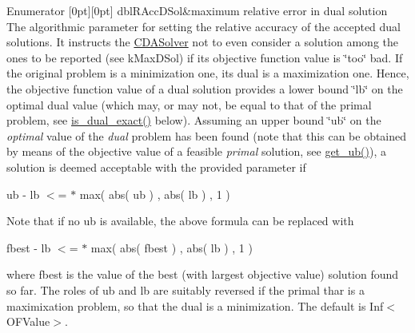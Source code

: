 \begin{DoxyEnumFields}{Enumerator}
[0pt][0pt]{}\mbox{\label{class_s_m_spp__di__unipi__it_1_1_c_d_a_solver_a12473d2c0cbab01587927c637e3f7e4baf904648a60949087c00b4c1a0f2a0fbb}} 
dbl\+R\+Acc\+D\+Sol&maximum relative error in dual solution The algorithmic parameter for setting the relative accuracy of the accepted dual solutions. It instructs the \mbox{\hyperlink{class_s_m_spp__di__unipi__it_1_1_c_d_a_solver}{C\+D\+A\+Solver}} not to even consider a solution among the ones to be reported (see k\+Max\+D\+Sol) if its objective function value is \char`\"{}too\char`\"{} bad. If the original problem is a minimization one, its dual is a maximization one. Hence, the objective function value of a dual solution provides a lower bound \char`\"{}lb\char`\"{} on the optimal dual value (which may, or may not, be equal to that of the primal problem, see \mbox{\hyperlink{class_s_m_spp__di__unipi__it_1_1_c_d_a_solver_a402db4cab5024abd480ae2186cf467cc}{is\+\_\+dual\+\_\+exact()}} below). Assuming an upper bound \char`\"{}ub\char`\"{} on the {\itshape optimal} value of the {\itshape dual} problem has been found (note that this can be obtained by means of the objective value of a feasible {\itshape primal} solution, see \mbox{\hyperlink{class_s_m_spp__di__unipi__it_1_1_solver_a7304d819b2eeff3d4ba650055b24e3a5}{get\+\_\+ub()}}), a solution is deemed acceptable with the provided parameter  if

ub -\/ lb $<$=  $\ast$ max( abs( ub ) , abs( lb ) , 1 )

Note that if no ub is available, the above formula can be replaced with

fbest -\/ lb $<$=  $\ast$ max( abs( fbest ) , abs( lb ) , 1 )

where fbest is the value of the best (with largest objective value) solution found so far. The roles of ub and lb are suitably reversed if the primal thar is a maximixation problem, so that the dual is a minimization. The default is Inf$<$\+O\+F\+Value$>$. \\
\hline


\end{DoxyEnumFields}

